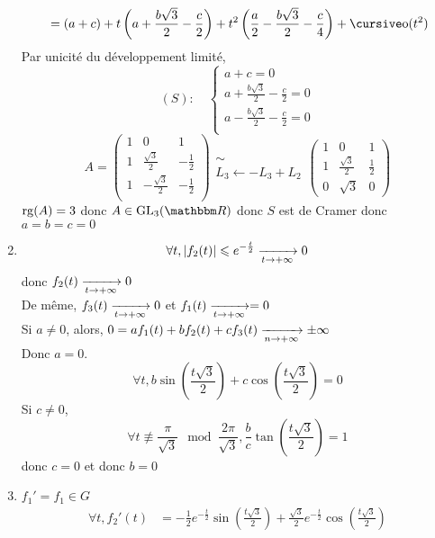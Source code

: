 \begin{enumerate}
\begin{align*}
																	&= (a+c) + t\left( a+\frac{b\sqrt{3}}{2} -\frac{c}{2} \right) + t^2\left( \frac{a}{2}-\frac{b\sqrt{3}}{2} - \frac{c}{4} \right) + \po(t^2) \\
		\end{align*}
		Par unicité du développement limité, \[
			(S): \quad \begin{cases}
				a+c= 0\\
				a+\frac{b\sqrt{3}}{2} - \frac{c}{2} = 0\\
				a-\frac{b\sqrt{3}}{2} - \frac{c}{2} = 0\\
			\end{cases}
		\]
		\[
			A = \begin{pmatrix}
				1&0&1\\
				1&\frac{\sqrt{3}}{2}&-\frac{1}{2}\\
				1&-\frac{\sqrt{3}}{2}&-\frac{1}{2}\\
			\end{pmatrix} 
			\begin{array}{c}
				\sim\\
				L_3 \leftarrow -L_3 + L_2
			\end{array} 
			\begin{pmatrix}
				1&0&1\\
				1&\frac{\sqrt{3}}{2}&\frac{1}{2}\\
				0&\sqrt{3} &0
			\end{pmatrix} 
		\] 
		$\operatorname{rg}(A) = 3$ donc $A \in \mathrm{GL}_3(\R)$ donc $S$ est de Cramer donc $a = b = c = 0$
	\item \[
			\forall t, \left| f_2(t) \right| \leqslant e^{-\frac{t}{2}}\xrightarrow[t\to +\infty]{} 0
		\] donc $f_2(t) \xrightarrow[t\to +\infty]{} 0$ \\
		De même, $f_3(t) \xrightarrow[t \to +\infty]{} 0$ et $f_1(t) \xrightarrow[t\to +\infty]{} = 0$\\
		Si $a \neq 0$, alors, $0 = af_1(t) + bf_2(t) + cf_3(t) \xrightarrow[n\to +\infty]{} \pm \infty$\\
		Donc $a = 0$. \[
			\forall t, b\sin\left( \frac{t\sqrt{3}}{2} \right) + c \cos\left( \frac{t\sqrt{3}}{2} \right) = 0
		\]
		Si $c \neq 0$, \[
			\forall t \not\equiv \frac{\pi}{\sqrt{3}} \mod{\frac{2\pi}{\sqrt{3}}}, \frac{b}{c}\tan\left( \frac{t\sqrt{3}}{2} \right) =1
		\] donc $c = 0$ et donc $b = 0$ 
	\item $f_1' = f_1 \in G$
		\begin{align*}
			\forall t, f_2'(t) &= -\frac{1}{2}e^{-\frac{t}{2}}\sin\left( \frac{t\sqrt{3}}{2} \right) + \frac{\sqrt{3}}{2} e^{-\frac{t}{2}} \cos\left( \frac{t\sqrt{3}}{2}  \right)\\

\end{align*}
\end{enumerate}
